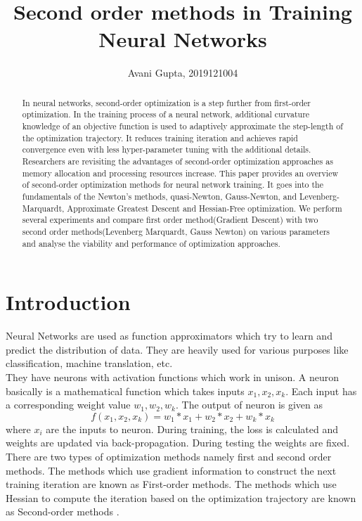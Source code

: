 \documentclass[journal]{IEEEtran}
\begin{document}
\title{Second order methods in Training Neural Networks}

\author{Avani Gupta, 2019121004}%
        

\maketitle

\begin{abstract}
In neural networks, second-order optimization is a step further from first-order optimization. In the training process of a neural network, additional curvature knowledge of an objective function is used to adaptively approximate the step-length of the optimization trajectory. It reduces training iteration and achieves rapid convergence even with less hyper-parameter tuning with the additional details.
Researchers are revisiting the advantages of second-order optimization approaches as memory allocation and processing resources increase. This paper provides an overview of second-order optimization methods for neural network training. It goes into the fundamentals of the Newton's methods, quasi-Newton, Gauss-Newton, and Levenberg-Marquardt, Approximate Greatest Descent and Hessian-Free optimization.  We perform several experiments and compare  first order method(Gradient Descent) with two second order methods(Levenberg Marquardt, Gauss Newton) on various parameters and analyse the viability and performance of optimization approaches.
\end{abstract}


\section{Introduction }
Neural Networks are used as function approximators which try to learn and predict the distribution of data. They are heavily used for various purposes like classification, machine translation, etc. \\
They have neurons with activation functions which work in unison. 
A neuron basically is a mathematical function which takes  inputs $x_{1}, x_{2}, x_{k}$. Each input has a corresponding weight value $w_{1}, w_{2}, w_{k}$. The output of neuron is given as $$f(x_{1}, x_{2}, x_{k}) = w_{1}*x_{1} + w_{2}*x_{2}+ w_{k}*x_{k}$$   where $x_{i}$ are the inputs to neuron.
During training, the loss is calculated and weights are updated via back-propagation. During testing the weights are fixed.
There are two types of optimization methods namely first and second order methods. The methods which use gradient information to construct the next training iteration are known as First-order methods. The methods which use Hessian to compute the iteration based on the optimization trajectory are known as Second-order methods \cite{battiti1992first}.
\end{document}
